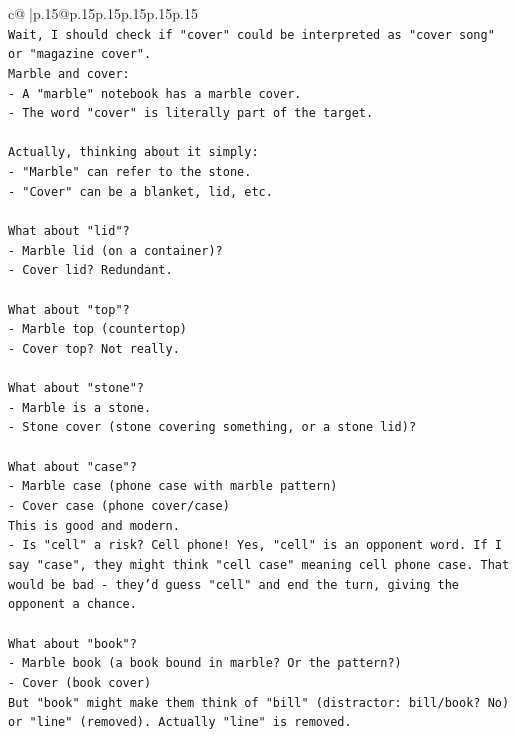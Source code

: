 \documentclass{article}
\begin{document}
{\begin{supertabular}{c@{$\;$}|p{.15\linewidth}@{}p{.15\linewidth}p{.15\linewidth}p{.15\linewidth}p{.15\linewidth}p{.15\linewidth}}
{{{\\ 
\texttt{Wait, I should check if "cover" could be interpreted as "cover song" or "magazine cover".} \\
\texttt{Marble and cover:} \\
\texttt{{-} A "marble" notebook has a marble cover.} \\
\texttt{{-} The word "cover" is literally part of the target.} \\
\\ 
\texttt{Actually, thinking about it simply:} \\
\texttt{{-} "Marble" can refer to the stone.} \\
\texttt{{-} "Cover" can be a blanket, lid, etc.} \\
\\ 
\texttt{What about "lid"?} \\
\texttt{{-} Marble lid (on a container)?} \\
\texttt{{-} Cover lid? Redundant.} \\
\\ 
\texttt{What about "top"?} \\
\texttt{{-} Marble top (countertop)} \\
\texttt{{-} Cover top? Not really.} \\
\\ 
\texttt{What about "stone"?} \\
\texttt{{-} Marble is a stone.} \\
\texttt{{-} Stone cover (stone covering something, or a stone lid)?} \\
\\ 
\texttt{What about "case"?} \\
\texttt{{-} Marble case (phone case with marble pattern)} \\
\texttt{{-} Cover case (phone cover/case)} \\
\texttt{This is good and modern.} \\
\texttt{{-} Is "cell" a risk? Cell phone! Yes, "cell" is an opponent word. If I say "case", they might think "cell case" meaning cell phone case. That would be bad {-} they'd guess "cell" and end the turn, giving the opponent a chance.} \\
\\ 
\texttt{What about "book"?} \\
\texttt{{-} Marble book (a book bound in marble? Or the pattern?)} \\
\texttt{{-} Cover (book cover)} \\
\texttt{But "book" might make them think of "bill" (distractor: bill/book? No) or "line" (removed). Actually "line" is removed.} \\
}}}
\end{supertabular}}
\end{document}
